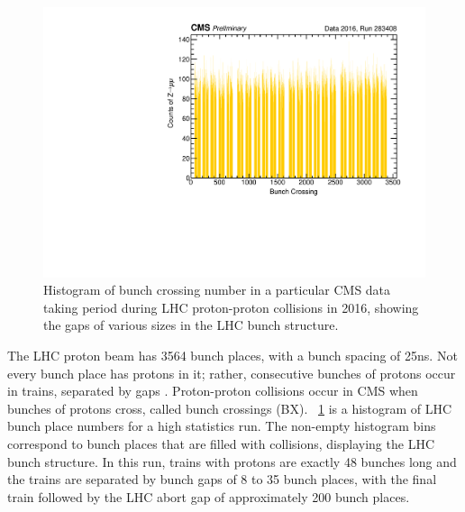 \begin{figure}[tbp]
	\centering
	\includegraphics[width=\dummyFigWidth]{figures/neutron/BXstructure.pdf}
	\caption{Histogram of bunch crossing number in a particular CMS data taking period during LHC proton-proton collisions in 2016, showing the gaps of various sizes in the LHC bunch structure.}
	\label{fig:bunch_structure}
\end{figure}

The LHC proton beam has 3564 bunch places, with a bunch spacing of 25\unit{ns}. Not every bunch place has protons in it; rather, consecutive bunches of protons occur in trains, separated by gaps \cite{Evans:2008zzb}. Proton-proton collisions occur in CMS when bunches of protons cross, called bunch crossings (BX). \Fig~\ref{fig:bunch_structure} is a histogram of LHC bunch place numbers for a high statistics run. The non-empty histogram bins correspond to bunch places that are filled with \pp collisions, displaying the LHC bunch structure. In this run, trains with protons are exactly 48 bunches long and the trains are separated by bunch gaps of 8 to 35 bunch places, with the final train followed by the LHC abort gap of approximately 200 bunch places.


